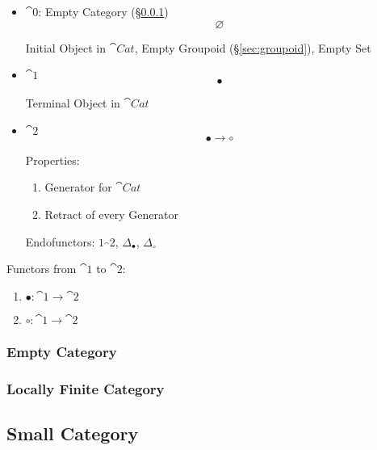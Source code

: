 \begin{itemize}
  \item $\cat{0}$: Empty Category (\S\ref{sec:empty_category})
    \[
      \varnothing
    \]

    Initial Object in $\cat{Cat}$, Empty Groupoid
    (\S\ref{sec:groupoid}), Empty Set

  \item $\cat{1}$
    \[
      \bullet
    \]

    Terminal Object in $\cat{Cat}$

  \item $\cat{2}$
    \[
      \bullet \longrightarrow \circ
    \]

    Properties:
    \begin{enumerate}
    \item Generator for $\cat{Cat}$ %
    \item Retract of every Generator
    \end{enumerate}

    Endofunctors: $1_\cat{2}$, $\Delta_\bullet$, $\Delta_\circ$

\end{itemize}

Functors from $\cat{1}$ to $\cat{2}$:
\begin{enumerate}
  \item $\bullet : \cat{1} \rightarrow \cat{2}$
  \item $\circ : \cat{1} \rightarrow \cat{2}$
\end{enumerate}



\subsubsection{Empty Category}\label{sec:empty_category}

\subsubsection{Locally Finite Category}
\label{sec:locally_finite_category}



\subsection{Small Category}\label{sec:small_category}

